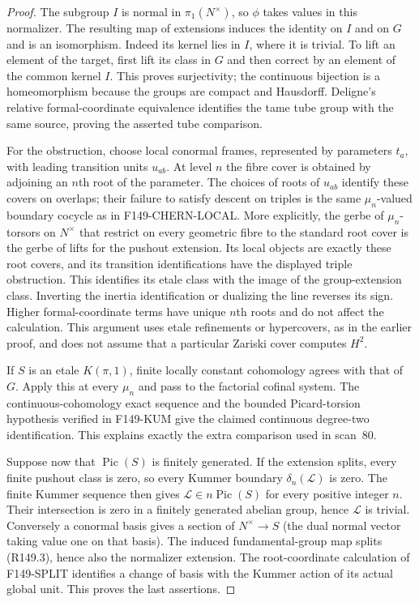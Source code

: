\documentclass[11pt,a4paper]{article}
\theoremstyle{definition}
\begin{document}
\begin{proof}
The subgroup $I$ is normal in $\pi_1(N^\times)$, so $\phi$
takes values in this normalizer. The resulting map of extensions
induces the identity on $I$ and on $G$ and is an isomorphism.
Indeed its kernel lies in $I$, where it is trivial. To lift an
element of the target, first lift its class in $G$ and then correct
by an element of the common kernel $I$. This proves surjectivity;
the continuous bijection is a homeomorphism because the groups
are compact and Hausdorff. Deligne's relative formal-coordinate
equivalence identifies the tame tube group with the same source,
proving the asserted tube comparison.

For the obstruction, choose local conormal frames, represented by
parameters $t_a$, with leading transition units $u_{ab}$. At level
$n$ the fibre cover is obtained by adjoining an $n$th root of the
parameter. The choices of roots of $u_{ab}$ identify these covers
on overlaps; their failure to satisfy descent on triples is the
same $\mu_n$-valued boundary cocycle as in F149-CHERN-LOCAL.
More explicitly, the gerbe of $\mu_n$-torsors on $N^\times$
that restrict on every geometric fibre to the standard root cover
is the gerbe of lifts for the pushout extension. Its local objects
are exactly these root covers, and its transition identifications
have the displayed triple obstruction. This identifies its etale
class with the image of the group-extension class. Inverting the
inertia identification or dualizing the
line reverses its sign. Higher formal-coordinate terms have unique
$n$th roots and do not affect the calculation. This argument uses
etale refinements or hypercovers, as in the earlier proof, and does
not assume that a particular Zariski cover computes $H^2$.

If $S$ is an etale $K(\pi,1)$, finite locally constant cohomology
agrees with that of $G$. Apply this at every $\mu_n$ and pass to
the factorial cofinal system. The continuous-cohomology exact
sequence and the bounded Picard-torsion hypothesis verified in
F149-KUM give the claimed continuous degree-two identification.
This explains exactly the extra comparison used in scan~80.

Suppose now that $\operatorname{Pic}(S)$ is finitely generated.
If the extension splits, every finite pushout class is zero, so
every Kummer boundary $\delta_n(\mathcal L)$ is zero. The finite
Kummer sequence then gives $\mathcal L\in n\operatorname{Pic}(S)$
for every positive integer $n$. Their intersection is zero in a
finitely generated abelian group, hence $\mathcal L$ is trivial.
Conversely a conormal basis gives a section of $N^\times\to S$
(the dual normal vector taking value one on that basis). The
induced fundamental-group map splits (R149.3), hence also the
normalizer extension. The root-coordinate calculation of
F149-SPLIT identifies a change of basis with the Kummer action of
its actual global unit. This proves the last assertions.
\end{proof}
\end{document}

